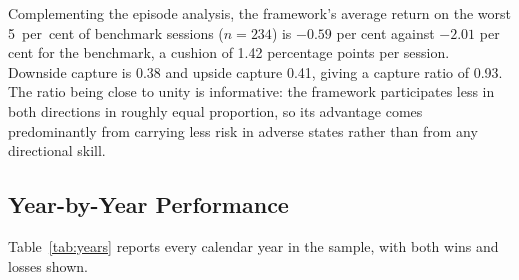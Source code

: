 Complementing the episode analysis, the framework's average return on the worst
5~per~cent of benchmark sessions ($n = 234$) is $-0.59$ per cent against $-2.01$ per
cent for the benchmark, a cushion of 1.42 percentage points per session. Downside
capture is 0.38 and upside capture 0.41, giving a capture ratio of 0.93. The ratio
being close to unity is informative: the framework participates less in both directions
in roughly equal proportion, so its advantage comes predominantly from carrying less
risk in adverse states rather than from any directional skill.

\subsection{Year-by-Year Performance}

Table~\ref{tab:years} reports every calendar year in the sample, with both wins and losses shown.


